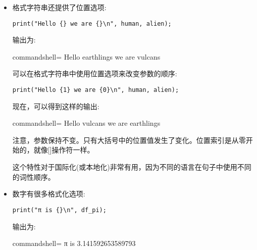 \begin{itemize}
这个简单的单行函数提供了一个有用的print()函数，可以用它来代替cout <{}< format()组合:

\begin{lstlisting}[style=styleCXX]
print("Hello {}\n", human);
\end{lstlisting}

输出为:

\begin{tcblisting}{commandshell={}}
Hello earthlings
\end{tcblisting}

该函数的更完整版本可以在示例文件的include目录中找到。

\item 
格式字符串还提供了位置选项:

\begin{lstlisting}[style=styleCXX]
print("Hello {} we are {}\n", human, alien);
\end{lstlisting}

输出为:

\begin{tcblisting}{commandshell={}}
Hello earthlings we are vulcans
\end{tcblisting}

可以在格式字符串中使用位置选项来改变参数的顺序:

\begin{lstlisting}[style=styleCXX]
print("Hello {1} we are {0}\n", human, alien);
\end{lstlisting}

现在，可以得到这样的输出:

\begin{tcblisting}{commandshell={}}
Hello vulcans we are earthlings
\end{tcblisting}

注意，参数保持不变。只有大括号中的位置值发生了变化。位置索引是从零开始的，就像[]操作符一样。

这个特性对于国际化(或本地化)非常有用，因为不同的语言在句子中使用不同的词性顺序。

\item 
数字有很多格式化选项:

\begin{lstlisting}[style=styleCXX]
print("π is {}\n", df_pi);
\end{lstlisting}

输出为:

\begin{tcblisting}{commandshell={}}
π is 3.141592653589793
\end{tcblisting}


\end{itemize}
